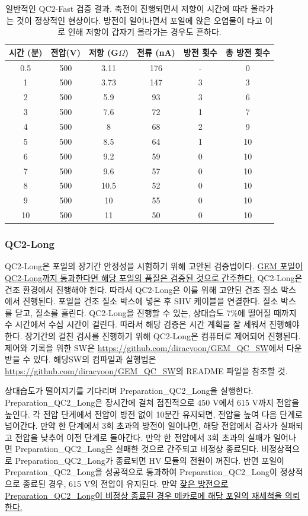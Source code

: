 \documentclass[11pt]{article}
\begin{document}
\begin{table}[htb]
  \centering
  \begin{tabular}{|c|c|c|c|c|c|}
    \hline
    시간 (분) & 전압(V) & 저항 (G$\Omega$) & 전류 (nA) & 방전 횟수 & 총 방전 횟수\\
    \hline
    0.5 & 500 & 3.11 & 176 & - & 0\\
    1   & 500 & 3.73 & 147 & 3 & 3\\
    2   & 500 & 5.9  & 93  & 3 & 6\\
    3   & 500 & 7.6  & 72  & 1 & 7\\
    4   & 500 & 8    & 68  & 2 & 9\\
    5   & 500 & 8.5  & 64  & 1 & 10\\
    6   & 500 & 9.2  & 59  & 0 & 10\\
    7   & 500 & 9.6  & 57  & 0 & 10\\
    8   & 500 & 10.5 & 52  & 0 & 10\\
    9   & 500 & 10   & 55  & 0 & 10\\
    10  & 500 & 11   & 50  & 0 & 10\\
    \hline
  \end{tabular}
  \caption[일반적인 QC2-Fast 검증 결과]{일반적인 QC2-Fast 검증 결과. 축전이 진행되면서 저항이 시간에 따라 올라가는 것이 정상적인 현상이다. 방전이 일어나면서 포일에 앉은 오염물이 타고 이로 인해 저항이 갑자기 올라가는 경우도 흔하다.}
  \label{tab:example_qc2_fast_result}
\end{table}
  
\subsubsection{QC2-Long}
QC2-Long은 포일의 장기간 안정성을 시험하기 위해 고안된 검증법이다. \uline{GEM 포일이 QC2-Long까지 통과한다면 해당 포일의 품질은 검증된 것으로 간주한다.} QC2-Long은 건조 환경에서 진행해야 한다. 따라서 QC2-Long은 이를 위해 고안된 건조 질소 박스에서 진행된다. 포일을 건조 질소 박스에 넣은 후 SHV 케이블을 연결한다. 질소 박스를 닫고, 질소를 흘린다. QC2-Long을 진행할 수 있는, 상대습도 7\%에 떨어질 때까지 수 시간에서 수십 시간이 걸린다. 따라서 해당 검증은 시간  계획을 잘 세워서 진행해야 한다. 장기간의 걸친 검사를 진행하기 위해 QC2-Long은 컴퓨터로 제어되어 진행된다. 제어와 기록을 위한 SW은 \url{https://github.com/diracyoon/GEM_QC_SW}에서 다운 받을 수 있다. 해당SW의 컴파일과 실행법은 \url{https://github.com/diracyoon/GEM_QC_SW}의 README 파일을 참조할 것.

상대습도가 떨어지기를 기다리며 Preparation\_QC2\_Long을 실행한다. Preparation\_QC2\_Long은 장시간에 걸쳐 점진적으로 450 V에서 615 V까지 전압을 높인다. 각 전압 단계에서 전압이 방전 없이 10분간 유지되면, 전압을 높여 다음 단계로 넘어간다. 만약 한 단계에서 3회 초과의 방전이 일어나면, 해당 전압에서 검사가 실패되고 전압을 낮추어 이전 단계로 돌아간다. 만약 한 전압에서 3회 초과의 실패가 일어나면 Preparation\_QC2\_Long은 실패한 것으로 간주되고 비정상 종료된다. 비정상적으로 Preparation\_QC2\_Long가 종료되면 HV 모듈의 전원이 꺼진다. 반면 포일이 Preparation\_QC2\_Long을 성공적으로 통과하여 Preparation\_QC2\_Long이 정상적으로 종료된 경우, 615 V의 전압이 유지된다. 만약 \uline{잦은 방전으로 Preparation\_QC2\_Long이 비정상 종료된 경우 메카로에 해당 포일의 재세척을 의뢰한다.}
\end{document}
